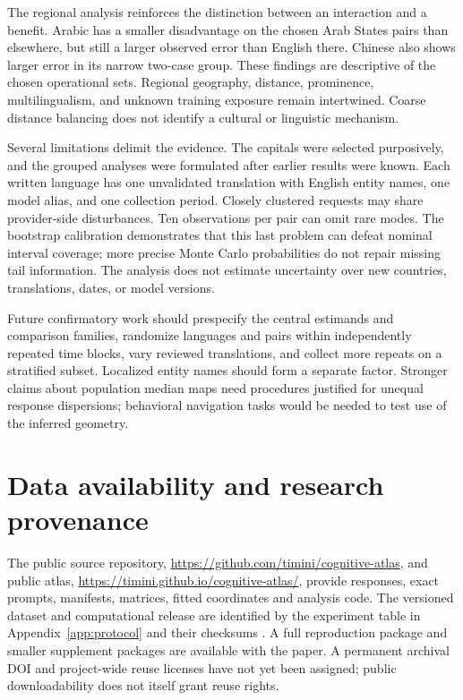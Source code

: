 \documentclass[12pt,a4paper]{article}
\begin{document}
The regional analysis reinforces the distinction between an interaction and a benefit. Arabic has a smaller disadvantage on the chosen Arab States pairs than elsewhere, but still a larger observed error than English there. Chinese also shows larger error in its narrow two-case group. These findings are descriptive of the chosen operational sets. Regional geography, distance, prominence, multilingualism, and unknown training exposure remain intertwined. Coarse distance balancing does not identify a cultural or linguistic mechanism.

Several limitations delimit the evidence. The capitals were selected purposively, and the grouped analyses were formulated after earlier results were known. Each written language has one unvalidated translation with English entity names, one model alias, and one collection period. Closely clustered requests may share provider-side disturbances. Ten observations per pair can omit rare modes. The bootstrap calibration demonstrates that this last problem can defeat nominal interval coverage; more precise Monte Carlo probabilities do not repair missing tail information. The analysis does not estimate uncertainty over new countries, translations, dates, or model versions.

Future confirmatory work should prespecify the central estimands and comparison families, randomize languages and pairs within independently repeated time blocks, vary reviewed translations, and collect more repeats on a stratified subset. Localized entity names should form a separate factor. Stronger claims about population median maps need procedures justified for unequal response dispersions; behavioral navigation tasks would be needed to test use of the inferred geometry.

\section{Data availability and research provenance}
The public source repository, \url{https://github.com/timini/cognitive-atlas}, and public atlas, \url{https://timini.github.io/cognitive-atlas/}, provide responses, exact prompts, manifests, matrices, fitted coordinates and analysis code. The versioned dataset and computational release are identified by the experiment table in Appendix~\ref{app:protocol} and their checksums \cite{atlasdata}. A full reproduction package and smaller supplement packages are available with the paper. A permanent archival DOI and project-wide reuse licenses have not yet been assigned; public downloadability does not itself grant reuse rights.
\end{document}
